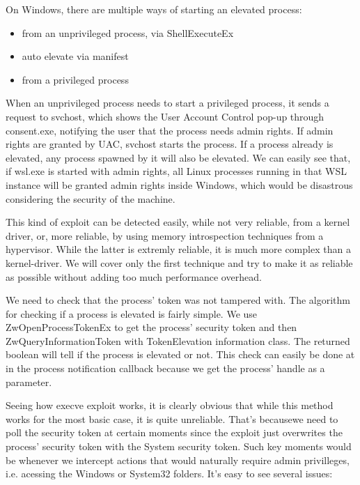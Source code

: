 \documentclass[conference]{IEEEtran}
\begin{document}
    \par{}
    On Windows, there are multiple ways of starting an elevated process:
    \begin{itemize}
        \item from an unprivileged process, via ShellExecuteEx %
        \item auto elevate via manifest
        \item from a privileged process
    \end{itemize}

    \par{}
    When an unprivileged process needs to start a privileged process, it sends a request to svchost, which shows the User Account Control pop-up
    through consent.exe, notifying the user that the process needs admin rights. If admin rights are granted by UAC, svchost starts the process.
    If a process already is elevated, any process spawned by it will also be elevated. We can easily see that, if wsl.exe is started with admin
    rights, all Linux processes running in that WSL instance will be granted admin rights inside Windows, which would be disastrous considering
    the security of the machine.\\
    
    \par{}
    This kind of exploit can be detected easily, while not very reliable, from a kernel driver, or, more reliable, by using memory introspection
    techniques from a hypervisor. While the latter is extremly reliable, it is much more complex than a kernel-driver. We will cover only the
    first technique and try to make it as reliable as possible without adding too much performance overhead.\\
    
    \par{}
    We need to check that the process' token was not tampered with. The algorithm for checking if a process is elevated is fairly simple. We use
    ZwOpenProcessTokenEx to get the process' security token and then ZwQueryInformationToken with TokenElevation information class. The
    returned boolean will tell if the process is elevated or not. This check can easily be done at in the process notification callback because
    we get the process' handle as a parameter.\\
    
    \par{}
    Seeing how execve exploit works, it is clearly obvious that while this method works for the most basic case, it is quite unreliable.
    That's becausewe need to  poll the security token at certain moments since the exploit just overwrites the process' security token with
    the System security token. Such key moments would be whenever we intercept actions that would naturally require admin privilleges,
    i.e. acessing the Windows or System32 folders.
    It's easy to see several issues:\\
\end{document}
